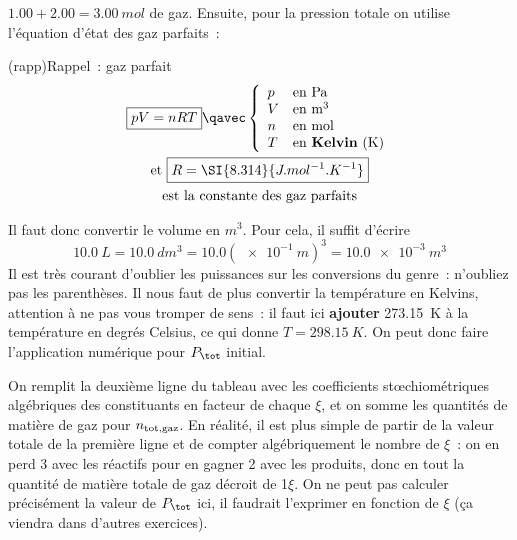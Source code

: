 \documentclass[../../main/main.tex]{subfiles}
\begin{document}
{	$\num{1.00}+\num{2.00} = \SI{3.00}{mol}$ de gaz. Ensuite, pour la
	pression totale on utilise l'équation d'état des gaz parfaits~:
	\begin{tcb}(rapp){Rappel~: gaz parfait}
		\begin{gather*}
			\boxed{pV = nRT}
			\qavec
			\left\{
			\begin{array}{ll}
				p & \text{en Pa }                 \\
				V & \text{en m}^3                 \\
				n & \text{en mol}                 \\
				T & \text{en \textbf{Kelvin} (K)}
			\end{array}
			\right.\\
			\text{et }
			\boxed{R = \SI{8.314}{J.mol^{-1}.K^{-1}}}\\
			\text{est la constante des gaz parfaits}
		\end{gather*}
	\end{tcb}
	Il faut donc convertir le volume en $\si{m^3}$. Pour cela, il suffit
	d'écrire
	\[\SI{10.0}{L} = \SI{10.0}{dm^3} = \num{10.0}(\SI{e-1}{m})^3 =
		\SI{10.0e-3}{m^3}\]
	Il est très courant d'oublier les puissances sur les conversions du
	genre~: n'oubliez pas les parenthèses. Il nous faut de plus convertir la
	température en Kelvins, attention à ne pas vous tromper de sens~: il
	faut ici \textbf{ajouter} \SI{273.15}{K} à la température en degrés
	Celsius, ce qui donne $T = \SI{298.15}{K}$. On peut donc faire
	l'application numérique pour $P_{\tot}$ initial.\bigbreak

	On remplit la deuxième ligne du tableau avec les coefficients
	stœchiométriques algébriques des constituants en facteur de chaque
	$\xi$, et on somme les quantités de matière de gaz pour $n_{\rm tot,
				gaz}$. En réalité, il est plus simple de partir de la valeur totale de
	la première ligne et de compter algébriquement le nombre de $\xi$~: on
	en perd 3 avec les réactifs pour en gagner 2 avec les produits, donc en
	tout la quantité de matière totale de gaz décroit de 1$\xi$. On ne peut
	pas calculer précisément la valeur de $P_{\tot}$ ici, il faudrait
	l'exprimer en fonction de $\xi$ (ça viendra dans d'autres
	exercices).\bigbreak

}
\end{document}
